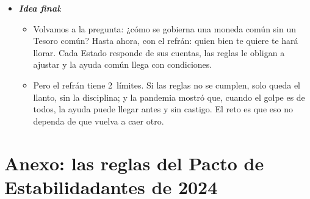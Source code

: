 \documentclass[11pt]{article}
\begin{document}
\begin{itemize}
\begin{itemize}
  \item Sin una capacidad fiscal común permanente, la próxima crisis volverá a depender de una cumbre de madrugada. Es el método que describió  en sus \emph{Memorias} (1976): Europa «se haría en las crisis» y sería «la suma de las soluciones» que se les dieran\footnote{En el original, \textcite{Monnet1976Memoires}: «J'ai toujours pensé que l'Europe se ferait dans les crises, et qu'elle serait la somme des solutions qu'on apporterait à ces crises».}. Ha funcionado, pero siempre a última hora.
  \end{itemize}
\item \textbf{\emph{Idea final}}:
  \begin{itemize}
  \item Volvamos a la pregunta: ¿cómo se gobierna una moneda común sin un Tesoro común? Hasta ahora, con el refrán: quien bien te quiere te hará llorar. Cada Estado responde de sus cuentas, las reglas le obligan a ajustar y la ayuda común llega con condiciones.

  \item Pero el refrán tiene 2~límites. Si las reglas no se cumplen, solo queda el llanto, sin la disciplina; y la pandemia mostró que, cuando el golpe es de todos, la ayuda puede llegar antes y sin castigo. El reto es que eso no dependa de que vuelva a caer otro.
  \end{itemize}
\end{itemize}

\clearpage
\appendix

\section{Anexo: las reglas del Pacto de Estabilidad\cortetitulo antes de 2024}\label{anexo:pec}
\end{document}

